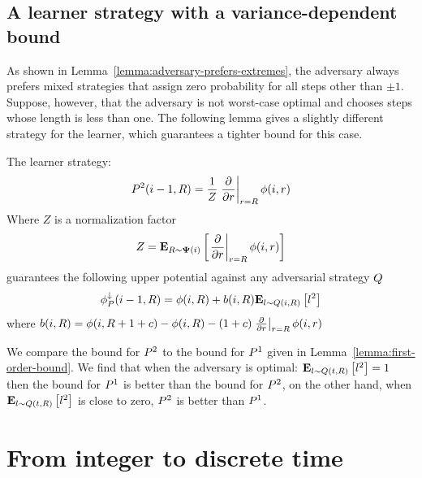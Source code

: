 \documentclass{article}[12pt]
\begin{document}
  \subsection{A learner strategy with a variance-dependent bound}

  As shown in Lemma~\ref{lemma:adversary-prefers-extremes}, the
  adversary always prefers mixed strategies that assign zero
  probability for all steps other than $\pm 1$. Suppose, however, that
  the adversary is not worst-case optimal and chooses steps whose
  length is less than one. The following lemma gives a slightly
  different strategy for the learner, which guarantees a tighter bound
  for this case.

  \begin{lemma} \label{lemma:second-order-bound}
      The learner strategy:
      \begin{equation} \label{eqn:learner-strat-2}
      P^2(i-1,R) =  \frac{1}{Z}
      \left. \frac{\partial}{\partial r} \right|_{r=R} \phi(i,r)
      \end{equation}
      Where $Z$ is a normalization factor
      $$Z = {\bf E}_{R \sim {\bf \Psi}(i)}\left[ \left. \frac{\partial}{\partial r} \right|_{r=R} \phi(i,r) \right]$$
      guarantees the following upper potential against any adversarial
      strategy $Q$
      \begin{equation} \label{eqn:value-iteration-upper}
        \phi_{P}^{\downarrow}(i-1, R) = \phi(i,R) + b(i,R) {\bf E}_{l \sim Q(i,R)}\left[ l^2 \right]
      \end{equation}
      where $b(i,R) = \phi(i,R+1+c) -\phi(i,R) - (1+c) \left. \frac{\partial}{\partial r} \right|_{r=R} \phi(i,r)$
   \end{lemma}

We compare the bound for $P^2$ to the bound for $P^1$
given in Lemma~\ref{lemma:first-order-bound}. We find that when the 
adversary is optimal: ${\bf E}_{l \sim Q(t,R)}\left[ l^2 \right]=1$ then the
bound for $P^1$ is better than the bound for $P^2$, on the
other hand, when ${\bf E}_{l \sim Q(t,R)}\left[ l^2 \right]$ is close to zero,
$P^2$ is better than $P^1$.  

\section{From integer to discrete time}
\label{sec:discrete}
\end{document}
